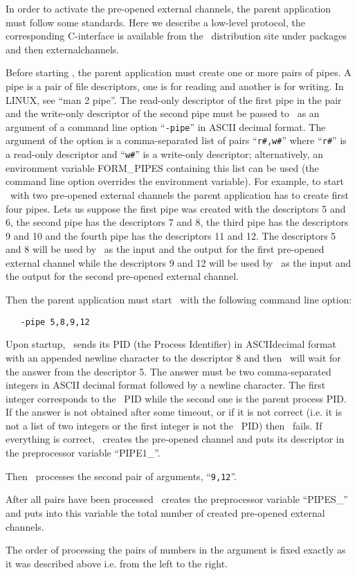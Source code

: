 In order to activate the pre-opened external channels, the parent
application must follow some standards. Here we describe a low-level 
protocol, the corresponding 
C-interface is available from the \FORM\ distribution site 
under packages and then externalchannels.

Before starting \FORM, the parent application must create one or more pairs 
of pipes. A pipe is a pair of file descriptors, one is for 
reading and another is for writing. In LINUX, see ``man 2 
pipe''. The read-only descriptor of the first pipe in the pair and the 
write-only descriptor of the second pipe must be passed to \FORM\ as an 
argument of a command line option ``\verb|-pipe|'' in ASCII decimal format. 
The argument of the option is a comma-separated list of pairs
``\verb|r#,w#|'' where ``\verb|r#|'' is a read-only descriptor and 
``\verb|w#|'' is a write-only descriptor; alternatively, an environment 
variable FORM\_PIPES containing this list can be used 
(the command line option overrides the environment variable). For example, 
to start \FORM\ with two pre-opened external channels the parent application 
has to create first four pipes. Lets us suppose the first pipe was created 
with the descriptors 5 and 6, the second pipe has the descriptors 7 and 8, 
the third pipe has the descriptors 9 and 10 and the fourth pipe has the 
descriptors 11 and 12. The descriptors 5 and 8 will be used by \FORM\ as the 
input and the output for the first pre-opened external channel while the 
descriptors 9 and 12 will be used by \FORM\ as the input and the output for 
the second pre-opened external channel.

Then the parent application must start \FORM\ with the following 
command line option:
\begin{verbatim}
   -pipe 5,8,9,12
\end{verbatim}

Upon startup, \FORM\ sends its PID (the Process Identifier) in 
ASCIIdecimal format with an appended newline character to the descriptor 8 
and then \FORM\ will wait for the answer from the descriptor 5. The answer 
must be two comma-separated integers in ASCII decimal format followed by a 
newline character. The first integer corresponds to the \FORM\ PID while the 
second one is the parent process PID. If the answer is not obtained after 
some timeout, or if it is not correct (i.e. it is not a list of two 
integers or the first integer is not the \FORM\ PID) then \FORM\ fails. If 
everything is correct, \FORM\ creates the pre-opened channel and puts its 
descriptor in the preprocessor variable ``PIPE1\_''.

Then \FORM\ processes the second pair of arguments, ``\verb|9,12|''.

After all pairs have been processed \FORM\ creates the preprocessor variable 
``PIPES\_'' and puts into this variable the total number of created 
pre-opened external channels.

The order of processing the pairs of numbers in the argument is fixed 
exactly as it was described above i.e. from the left to the right.


